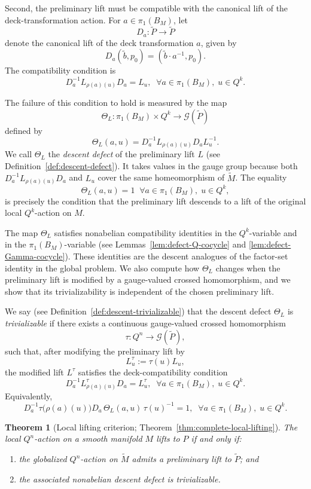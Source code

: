 \documentclass[11pt,a4paper]{article}
\numberwithin{equation}{section}
\newtheorem*{theorem}{Theorem}
\theoremstyle{named}
\begin{document}
Second, the preliminary lift must be compatible with the canonical lift of the deck-transformation action. For \(a\in\pi_1(B_M)\), let \[ D_a:\widetilde P\longrightarrow\widetilde P \] denote the canonical lift of the deck transformation \(a\), given by \[ D_a(\widetilde b,p_0)=(\widetilde b\cdot a^{-1},p_0). \] The compatibility condition is \[ D_a^{-1}L_{\rho(a)(u)}D_a=L_u,\;\;\forall a\in\pi_1(B_M),\;u\in Q^k.\] 

The failure of this condition to hold is measured by the map \[ \Theta_L:\pi_1(B_M)\times Q^k \longrightarrow \mathcal G(\widetilde P) \] defined by \[ \Theta_L(a,u) = D_a^{-1}L_{\rho(a)(u)}D_aL_u^{-1}. \] We call \(\Theta_L\) the \emph{descent defect} of the preliminary lift \(L\) (see Definition~\ref{def:descent-defect}). It takes values in the gauge group because both \(D_a^{-1}L_{\rho(a)(u)}D_a\) and \(L_u\) cover the same homeomorphism of \(\widetilde M\). The equality \[ \Theta_L(a,u)=1\;\;\forall a\in\pi_1(B_M),\;u\in Q^k, \] is precisely the condition that the preliminary lift descends to a lift of the original local \(Q^k\)-action on \(M\).

The map \(\Theta_L\) satisfies nonabelian compatibility identities in the \(Q^k\)-variable and in the \(\pi_1(B_M)\)-variable (see Lemmas~\ref{lem:defect-Q-cocycle} and \ref{lem:defect-Gamma-cocycle}). These identities are the descent analogues of the factor-set identity in the global problem. We also compute how \(\Theta_L\) changes when the preliminary lift is modified by a gauge-valued crossed homomorphism, and we show that its trivializability is independent of the chosen preliminary lift.

We say (see Definition~\ref{def:descent-trivializable}) that the descent defect \(\Theta_L\) is \emph{trivializable} if there exists a continuous gauge-valued crossed homomorphism \[ \tau:Q^n\longrightarrow\mathcal G(\widetilde P), \] such that, after modifying the preliminary lift by \[ L^\tau_u:=\tau(u)L_u, \] the modified lift \(L^\tau\) satisfies the deck-compatibility condition \[ D_a^{-1}L^\tau_{\rho(a)(u)}D_a=L^\tau_u,\;\;\forall a\in\pi_1(B_M),\;u\in Q^k.\] Equivalently, \[ D_a^{-1}\tau\bigl(\rho(a)(u)\bigr)D_a\, \Theta_L(a,u)\, \tau(u)^{-1} = 1,\;\;\forall a\in\pi_1(B_M),\;u\in Q^k. \] 

\begin{theorem}[Local lifting criterion; Theorem~\ref{thm:complete-local-lifting}] \label{thm:intro-local} The local \(Q^n\)-action on a smooth manifold \(M\) lifts to \(P\) if and only if: 
\begin{enumerate} 
\item[(1)] the globalized \(Q^n\)-action on \(\widetilde M\) admits a preliminary lift to \(\widetilde P\); and 
\item[(2)] the associated nonabelian descent defect is trivializable. \end{enumerate} 
\end{theorem} 
\end{document}
